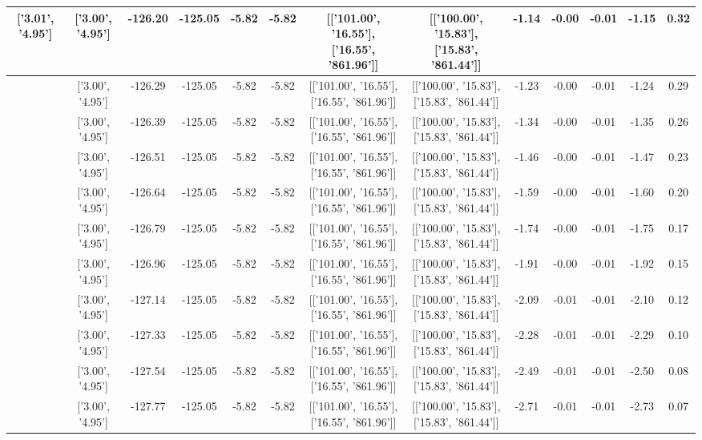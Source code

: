 \begin{table}[htbp]
\begin{adjustbox}{angle=90}
\begin{tabular}{|c|c|c|c|c|c|c|c|c|c|c|c|c|}
 ['3.01', '4.95'] & ['3.00', '4.95'] & -126.20 & -125.05 & -5.82 & -5.82 & [['101.00', '16.55'], ['16.55', '861.96']] & [['100.00', '15.83'], ['15.83', '861.44']] & -1.14 & -0.00 & -0.01 & -1.15 & 0.32\\ \hline
 ['3.01', '4.95'] & ['3.00', '4.95'] & -126.29 & -125.05 & -5.82 & -5.82 & [['101.00', '16.55'], ['16.55', '861.96']] & [['100.00', '15.83'], ['15.83', '861.44']] & -1.23 & -0.00 & -0.01 & -1.24 & 0.29\\ \hline
 ['3.01', '4.95'] & ['3.00', '4.95'] & -126.39 & -125.05 & -5.82 & -5.82 & [['101.00', '16.55'], ['16.55', '861.96']] & [['100.00', '15.83'], ['15.83', '861.44']] & -1.34 & -0.00 & -0.01 & -1.35 & 0.26\\ \hline
 ['3.01', '4.95'] & ['3.00', '4.95'] & -126.51 & -125.05 & -5.82 & -5.82 & [['101.00', '16.55'], ['16.55', '861.96']] & [['100.00', '15.83'], ['15.83', '861.44']] & -1.46 & -0.00 & -0.01 & -1.47 & 0.23\\ \hline
 ['3.01', '4.95'] & ['3.00', '4.95'] & -126.64 & -125.05 & -5.82 & -5.82 & [['101.00', '16.55'], ['16.55', '861.96']] & [['100.00', '15.83'], ['15.83', '861.44']] & -1.59 & -0.00 & -0.01 & -1.60 & 0.20\\ \hline
 ['3.01', '4.95'] & ['3.00', '4.95'] & -126.79 & -125.05 & -5.82 & -5.82 & [['101.00', '16.55'], ['16.55', '861.96']] & [['100.00', '15.83'], ['15.83', '861.44']] & -1.74 & -0.00 & -0.01 & -1.75 & 0.17\\ \hline
 ['3.01', '4.95'] & ['3.00', '4.95'] & -126.96 & -125.05 & -5.82 & -5.82 & [['101.00', '16.55'], ['16.55', '861.96']] & [['100.00', '15.83'], ['15.83', '861.44']] & -1.91 & -0.00 & -0.01 & -1.92 & 0.15\\ \hline
 ['3.01', '4.95'] & ['3.00', '4.95'] & -127.14 & -125.05 & -5.82 & -5.82 & [['101.00', '16.55'], ['16.55', '861.96']] & [['100.00', '15.83'], ['15.83', '861.44']] & -2.09 & -0.01 & -0.01 & -2.10 & 0.12\\ \hline
 ['3.02', '4.95'] & ['3.00', '4.95'] & -127.33 & -125.05 & -5.82 & -5.82 & [['101.00', '16.55'], ['16.55', '861.96']] & [['100.00', '15.83'], ['15.83', '861.44']] & -2.28 & -0.01 & -0.01 & -2.29 & 0.10\\ \hline
 ['3.02', '4.95'] & ['3.00', '4.95'] & -127.54 & -125.05 & -5.82 & -5.82 & [['101.00', '16.55'], ['16.55', '861.96']] & [['100.00', '15.83'], ['15.83', '861.44']] & -2.49 & -0.01 & -0.01 & -2.50 & 0.08\\ \hline
 ['3.02', '4.96'] & ['3.00', '4.95'] & -127.77 & -125.05 & -5.82 & -5.82 & [['101.00', '16.55'], ['16.55', '861.96']] & [['100.00', '15.83'], ['15.83', '861.44']] & -2.71 & -0.01 & -0.01 & -2.73 & 0.07\\ \hline

\end{tabular}
\end{adjustbox}
\end{table}
